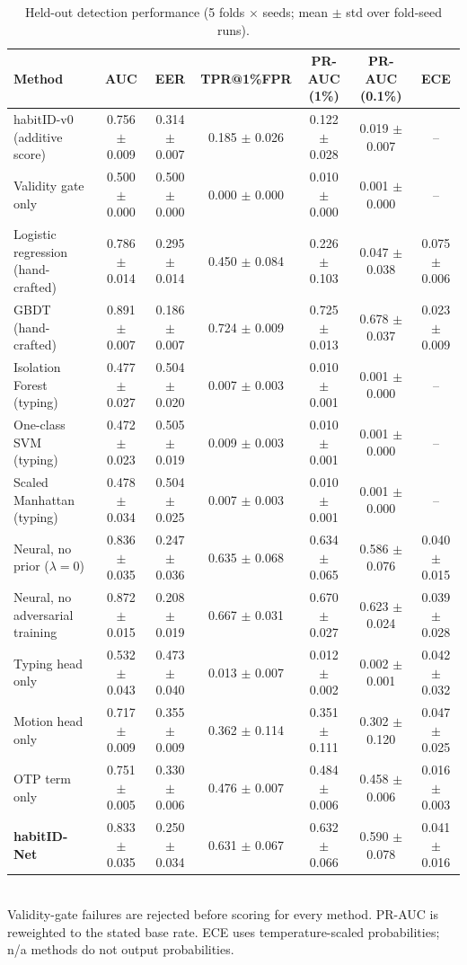 \begin{table}[t]
\caption{Held-out detection performance (5 folds $\times$ seeds; mean $\pm$ std over fold-seed runs).}
\label{tab:main}
\centering
\small
\begin{tabular}{lcccccc}
\toprule
Method & AUC & EER & TPR@1\%FPR & PR-AUC (1\%) & PR-AUC (0.1\%) & ECE \\
\midrule
habitID-v0 (additive score) & 0.756 $\pm$ 0.009 & 0.314 $\pm$ 0.007 & 0.185 $\pm$ 0.026 & 0.122 $\pm$ 0.028 & 0.019 $\pm$ 0.007 & -- \\
Validity gate only & 0.500 $\pm$ 0.000 & 0.500 $\pm$ 0.000 & 0.000 $\pm$ 0.000 & 0.010 $\pm$ 0.000 & 0.001 $\pm$ 0.000 & -- \\
Logistic regression (hand-crafted) & 0.786 $\pm$ 0.014 & 0.295 $\pm$ 0.014 & 0.450 $\pm$ 0.084 & 0.226 $\pm$ 0.103 & 0.047 $\pm$ 0.038 & 0.075 $\pm$ 0.006 \\
GBDT (hand-crafted) & 0.891 $\pm$ 0.007 & 0.186 $\pm$ 0.007 & 0.724 $\pm$ 0.009 & 0.725 $\pm$ 0.013 & 0.678 $\pm$ 0.037 & 0.023 $\pm$ 0.009 \\
Isolation Forest (typing) & 0.477 $\pm$ 0.027 & 0.504 $\pm$ 0.020 & 0.007 $\pm$ 0.003 & 0.010 $\pm$ 0.001 & 0.001 $\pm$ 0.000 & -- \\
One-class SVM (typing) & 0.472 $\pm$ 0.023 & 0.505 $\pm$ 0.019 & 0.009 $\pm$ 0.003 & 0.010 $\pm$ 0.001 & 0.001 $\pm$ 0.000 & -- \\
Scaled Manhattan (typing) & 0.478 $\pm$ 0.034 & 0.504 $\pm$ 0.025 & 0.007 $\pm$ 0.003 & 0.010 $\pm$ 0.001 & 0.001 $\pm$ 0.000 & -- \\
Neural, no prior ($\lambda{=}0$) & 0.836 $\pm$ 0.035 & 0.247 $\pm$ 0.036 & 0.635 $\pm$ 0.068 & 0.634 $\pm$ 0.065 & 0.586 $\pm$ 0.076 & 0.040 $\pm$ 0.015 \\
Neural, no adversarial training & 0.872 $\pm$ 0.015 & 0.208 $\pm$ 0.019 & 0.667 $\pm$ 0.031 & 0.670 $\pm$ 0.027 & 0.623 $\pm$ 0.024 & 0.039 $\pm$ 0.028 \\
Typing head only & 0.532 $\pm$ 0.043 & 0.473 $\pm$ 0.040 & 0.013 $\pm$ 0.007 & 0.012 $\pm$ 0.002 & 0.002 $\pm$ 0.001 & 0.042 $\pm$ 0.032 \\
Motion head only & 0.717 $\pm$ 0.009 & 0.355 $\pm$ 0.009 & 0.362 $\pm$ 0.114 & 0.351 $\pm$ 0.111 & 0.302 $\pm$ 0.120 & 0.047 $\pm$ 0.025 \\
OTP term only & 0.751 $\pm$ 0.005 & 0.330 $\pm$ 0.006 & 0.476 $\pm$ 0.007 & 0.484 $\pm$ 0.006 & 0.458 $\pm$ 0.006 & 0.016 $\pm$ 0.003 \\
\textbf{habitID-Net} & 0.833 $\pm$ 0.035 & 0.250 $\pm$ 0.034 & 0.631 $\pm$ 0.067 & 0.632 $\pm$ 0.066 & 0.590 $\pm$ 0.078 & 0.041 $\pm$ 0.016 \\
\bottomrule
\end{tabular}
\\[2pt]\footnotesize Validity-gate failures are rejected before scoring for every method. PR-AUC is reweighted to the stated base rate. ECE uses temperature-scaled probabilities; n/a methods do not output probabilities.
\end{table}
